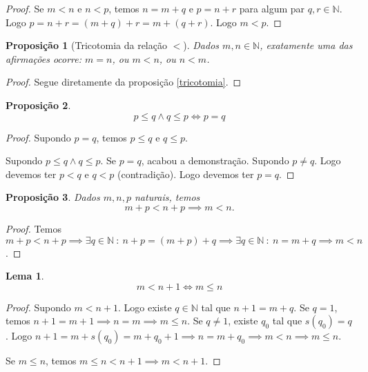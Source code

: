 \documentclass{article}
\theoremstyle{plain}
\newtheorem{prop}{Proposição}[section]
\newtheorem{lema}{Lema}
\theoremstyle{definition}
\theoremstyle{remark}
\begin{document}
\begin{proof}
	Se $m<n$ e $n<p$, temos $n = m+q$ e $p = n+r$ para algum par $q,r\in \mathbb{N}$. Logo $p = n +r = (m +q) +r =m +(q+r)$. Logo $m<p$.
\end{proof}
\begin{prop}[Tricotomia da relação $<$]
	Dados $m,n\in \mathbb{N}$, exatamente uma das afirmações ocorre: $m=n$, ou $m<n$, ou $n<m$.
\end{prop}
\begin{proof}
	Segue diretamente da proposição \ref{tricotomia}.
\end{proof}
\begin{prop}
	$$ p\leq q \land q \leq p \iff  p = q$$
\end{prop}
\begin{proof}
	Supondo $p = q$, temos $p\leq q $ e $q \leq p$. 

	Supondo $p\leq q \land q\leq p$. Se $p=q$, acabou a demonstração. Supondo $p\neq q$. Logo devemos ter $p <q $ e $q <p$ (contradição). Logo devemos ter $p=q$.

\end{proof}
\begin{prop}
	Dados $m,n,p$ naturais, temos $$m +p < n+p \implies m <n.$$
\end{prop}
\begin{proof}
	Temos $m+p < n+p \implies \exists q \in \mathbb{N} \: : \: n+p = (m+p) + q \implies  \exists q \in \mathbb{N} \: : \: n = m + q \implies m<n$.
\end{proof}
\begin{lema}
	\label{lemaDesigualdade}
	$$ m < n+1 \iff m \leq n$$
\end{lema}
\begin{proof}
	Supondo $m<n+1$. Logo existe $q\in \mathbb{N}$ tal que $n+1 = m+q$. Se $q = 1$, temos $n+1  = m+1 \implies n = m \implies m \leq n$. Se $q\neq 1$, existe $q_0$ tal que $s(q_0) = q$. Logo $n+1 = m+s(q_0) = m+q_0+1\implies n = m+q_0 \implies m< n \implies m \leq n$. 

	Se $m \leq n$, temos $m\leq n < n+1 \implies m<n+1$.
\end{proof}
\end{document}
